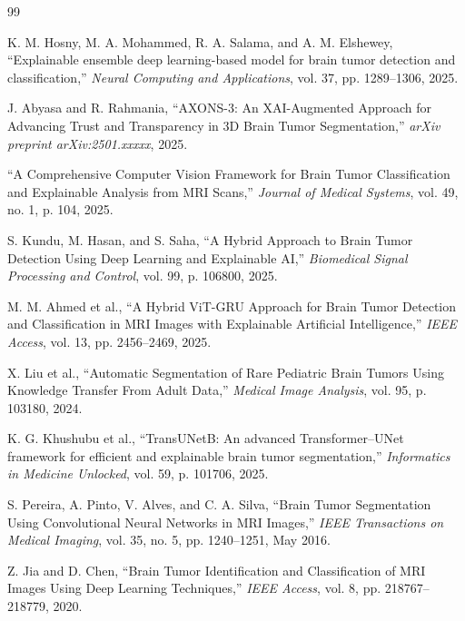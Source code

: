 \documentclass[journal,twoside]{IEEEtran}
\begin{document}
\begin{thebibliography}{99}

K. M. Hosny, M. A. Mohammed, R. A. Salama, and A. M. Elshewey, ``Explainable ensemble deep learning-based model for brain tumor detection and classification,'' \emph{Neural Computing and Applications}, vol. 37, pp. 1289--1306, 2025.

J. Abyasa and R. Rahmania, ``AXONS-3: An XAI-Augmented Approach for Advancing Trust and Transparency in 3D Brain Tumor Segmentation,'' \emph{arXiv preprint arXiv:2501.xxxxx}, 2025.

``A Comprehensive Computer Vision Framework for Brain Tumor Classification and Explainable Analysis from MRI Scans,'' \emph{Journal of Medical Systems}, vol. 49, no. 1, p. 104, 2025.

S. Kundu, M. Hasan, and S. Saha, ``A Hybrid Approach to Brain Tumor Detection Using Deep Learning and Explainable AI,'' \emph{Biomedical Signal Processing and Control}, vol. 99, p. 106800, 2025.

M. M. Ahmed et al., ``A Hybrid ViT-GRU Approach for Brain Tumor Detection and Classification in MRI Images with Explainable Artificial Intelligence,'' \emph{IEEE Access}, vol. 13, pp. 2456--2469, 2025.

X. Liu et al., ``Automatic Segmentation of Rare Pediatric Brain Tumors Using Knowledge Transfer From Adult Data,'' \emph{Medical Image Analysis}, vol. 95, p. 103180, 2024.

K. G. Khushubu et al., ``TransUNetB: An advanced Transformer--UNet framework for efficient and explainable brain tumor segmentation,'' \emph{Informatics in Medicine Unlocked}, vol. 59, p. 101706, 2025.

S. Pereira, A. Pinto, V. Alves, and C. A. Silva, ``Brain Tumor Segmentation Using Convolutional Neural Networks in MRI Images,'' \emph{IEEE Transactions on Medical Imaging}, vol. 35, no. 5, pp. 1240--1251, May 2016.

Z. Jia and D. Chen, ``Brain Tumor Identification and Classification of MRI Images Using Deep Learning Techniques,'' \emph{IEEE Access}, vol. 8, pp. 218767--218779, 2020.

\end{thebibliography}
\end{document}
